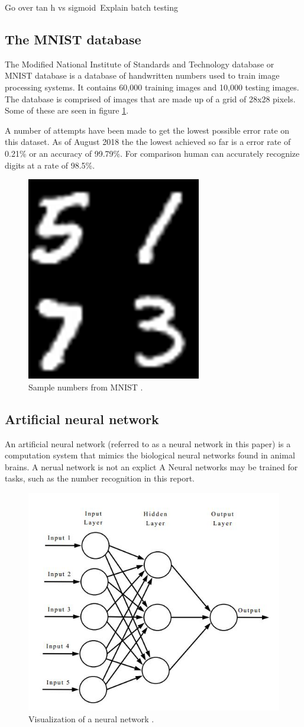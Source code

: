 \documentclass[12pt]{article}
\begin{document}
	Go over tan h vs sigmoid\
	Explain batch testing
	

	\subsection{The MNIST database}
	The Modified National Institute of Standards and Technology database or MNIST database\cite{mnistDATABASE} is a database of handwritten numbers used to train image processing systems. It contains 60,000 training images and 10,000 testing images. The database is comprised of images that are made up of a grid of 28x28 pixels. Some of these are seen in figure \ref{fig:mathworksmnistneuralnetfinal}. \par 
	
	A number of attempts have been made to get the lowest possible error rate on this dataset. As of August 2018 the  the lowest achieved so far is a error rate of 0.21\% or an accuracy of 99.79\%. For comparison human can accurately recognize digits at a rate of 98.5\%\cite{humanPerf}. 
	
	\begin{figure}[H]
		\centering
		\includegraphics[width=0.25\linewidth]{mathworks_mnist_neuralnetFinal_v2}
		\caption{Sample numbers from MNIST \cite{mnistMATLAB2}.}
		\label{fig:mathworksmnistneuralnetfinal}
	\end{figure}
	
	\subsection{Artificial neural network}
	An artificial neural network (referred to as a neural network in this paper) is a computation system that mimics the biological neural networks found in animal brains. A nerual network is not an explict
	A 
	Neural networks may be trained for tasks, such as the number recognition in this report. 
	
	\begin{figure}
		\centering
		\includegraphics[width=0.6\linewidth]{nnDiagram}
		\caption{Visualization of a neural network \cite{nnDiagramStack}. }
		\label{fig:nndiagram}
	\end{figure}
	
\end{document}
